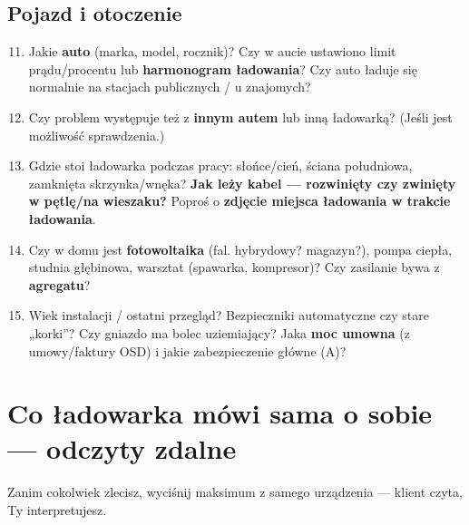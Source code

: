 \documentclass[11pt]{article}
\newcommand{\key}[1]{\textbf{\color{navy}#1}}
\begin{document}
\subsection{Pojazd i otoczenie}
\begin{enumerate}\setcounter{enumi}{10}
\item Jakie \key{auto} (marka, model, rocznik)? Czy w aucie ustawiono limit prądu/procentu lub \key{harmonogram ładowania}? Czy auto ładuje się normalnie na stacjach publicznych / u znajomych?
\item Czy problem występuje też z \key{innym autem} lub inną ładowarką? (Jeśli jest możliwość sprawdzenia.)
\item Gdzie stoi ładowarka podczas pracy: słońce/cień, ściana południowa, zamknięta skrzynka/wnęka? \key{Jak leży kabel — rozwinięty czy zwinięty w pętlę/na wieszaku?} Poproś o \key{zdjęcie miejsca ładowania w trakcie ładowania}.
\item Czy w domu jest \key{fotowoltaika} (fal. hybrydowy? magazyn?), pompa ciepła, studnia głębinowa, warsztat (spawarka, kompresor)? Czy zasilanie bywa z \key{agregatu}?
\item Wiek instalacji / ostatni przegląd? Bezpieczniki automatyczne czy stare „korki''? Czy gniazdo ma bolec uziemiający? Jaka \key{moc umowna} (z umowy/faktury OSD) i jakie zabezpieczenie główne (A)?
\end{enumerate}

\section{Co ładowarka mówi sama o sobie — odczyty zdalne}\label{sec:odczyty}
Zanim cokolwiek zlecisz, wyciśnij maksimum z samego urządzenia — klient czyta, Ty interpretujesz.
\end{document}
